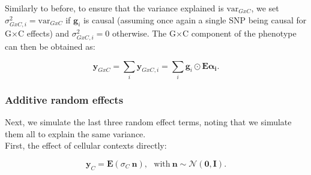 



Similarly to before, to ensure that the variance explained is $\mathrm{var}_{GxC}$, we set $\sigma^2_{GxC,i} = \mathrm{var}_{GxC}$
if $\mathbf{g}_i$ is causal (assuming once again a single SNP being causal for G$\times$C effects) and $\sigma_{GxC,i}^2=0$ otherwise.
The G$\times$C component of the phenotype can then be obtained as:

\begin{equation}
   \mathbf{y}_{GxC} = \sum_i \mathbf{y}_{GxC,i}= \sum_{i} \mathbf{g}_i \odot  \mathbf{E} \boldsymbol{\alpha_i}.
\end{equation}

\subsubsection{Additive random effects}

Next, we simulate the last three random effect terms, noting that we simulate them all to explain the same variance. \\

First, the effect of cellular contexts directly:

\begin{equation}
   \mathbf{y}_{C} = \mathbf{E} (\sigma_{C} \ \mathbf{n}), ~~~ \mathrm{with} \ \mathbf{n} \sim \mathcal{N}(\mathbf{0},\mathbf{I}).
\end{equation}

